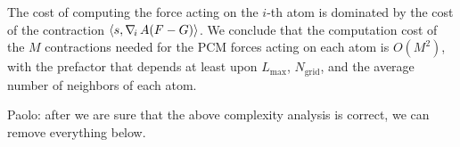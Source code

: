 The cost of computing the force acting on the $i$-th atom is dominated by the cost of the contraction $\langle s , \nabla_{\!i}\,  A ( F - G ) \rangle$. We conclude that the computation cost of the $M$ contractions needed for the PCM forces acting on each atom is $O(M^2)$, with the prefactor that depends at least upon $L_\text{max}$, $N_\text{grid}$, and the average number of neighbors of each atom.


%

{\color{red} Paolo: after we are sure that the above complexity analysis is correct, we can remove everything below.}

